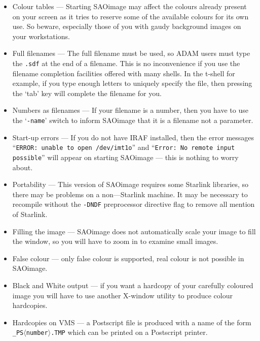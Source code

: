 \begin{itemize}

\item{Colour tables --- Starting SAOimage may affect the colours already
present on your screen as it tries to reserve some of the available
colours for its own use. So beware, especially those of you with gaudy
background images on your workstations.}

\item{Full filenames --- The full filename must be used, so ADAM users must
type the {\tt .sdf} at the end of  a filename. This is no inconvenience if you
use the filename completion facilities offered with many shells. In the t-shell
for example, if you type enough letters to uniquely specify the file, then
pressing the `tab' key will complete the filename for you.}

\item{Numbers as filenames --- If your filename is a number, then you have to
use the `{\tt -name}' switch to  inform SAOimage that it is a filename not a
parameter.}

\item{Start-up errors --- If you do not have IRAF installed, then the error
messages ``{\tt ERROR: unable to open /dev/imt1o}'' and ``{\tt Error:
No remote input possible}'' will appear on starting SAOimage --- this
is nothing to worry about.}

\item{Portability --- This version of SAOimage requires some Starlink
libraries, so there may be problems on a non---Starlink machine. It may
be necessary to recompile without the {\tt -DNDF} preprocessor directive
flag to remove all mention of Starlink.}

\item{Filling the image --- SAOimage does not automatically scale your image
to fill the window, so you will have to zoom in to examine small images.}

\item{False colour --- only false colour is supported, real colour is not
possible in SAOimage.}

\item{Black and White output --- if you want a hardcopy of your carefully
coloured image you will have to use another X-window utility to
produce colour hardcopies.}

\item{Hardcopies on VMS --- a Postscript file is produced with a name
of the form {\tt \_PS$\langle$number$\rangle$.TMP} which can be printed on a
Postscript printer.}


\end{itemize}
